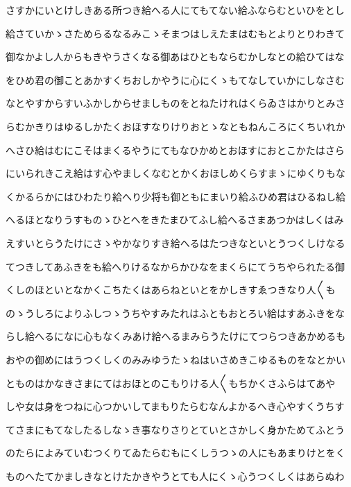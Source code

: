 \documentclass[a4paper,11pt,landscape]{ltjtarticle}
\begin{document}
\par\medskip
さすかにいとけしきある所つき給へる人にてもてない給ふならむといひをとし
\par\medskip
給さていかゝさためらるなるみこゝそまつはしえたまはむもとよりとりわきて
\par\medskip
御なかよし人からもきやうさくなる御あはひともならむかしなとの給ひてはな
\par\medskip
をひめ君の御ことあかすくちおしかやうに心にくゝもてなしていかにしなさむ
\par\medskip
なとやすからすいふかしからせましものをとねたけれはくらゐさはかりとみさ
\par\medskip
らむかきりはゆるしかたくおほすなりけりおとゝなともねんころにくちいれか
\par\medskip
へさひ給はむにこそはまくるやうにてもなひかめとおほすにおとこかたはさら
\par\medskip
にいられきこえ給はす心やましくなむとかくおほしめくらすまゝにゆくりもな
\par\medskip
くかるらかにはひわたり給へり少将も御ともにまいり給ふひめ君はひるねし給
\par\medskip
へるほとなりうすものゝひとへをきたまひてふし給へるさまあつかはしくはみ
\par\medskip
えすいとらうたけにさゝやかなりすき給へるはたつきなといとうつくしけなる
\par\medskip
てつきしてあふきをも給へりけるなからかひなをまくらにてうちやられたる御
\par\medskip
くしのほといとなかくこちたくはあらねといとをかしきすゑつきなり人〱も
\par\medskip
のゝうしろによりふしつゝうちやすみたれはふともおとろい給はすあふきをな
\par\medskip
らし給へるになに心もなくみあけ給へるまみらうたけにてつらつきあかめるも
\par\medskip
おやの御めにはうつくしくのみみゆうたゝねはいさめきこゆるものをなとかい
\par\medskip
とものはかなきさまにてはおほとのこもりける人〱もちかくさふらはてあや
\par\medskip
しや女は身をつねに心つかいしてまもりたらむなんよかるへき心やすくうちす
\par\medskip
てさまにもてなしたるしなゝき事なりさりとていとさかしく身かためてふとう
\par\medskip
のたらによみていむつくりてゐたらむもにくしうつゝの人にもあまりけとをく
\par\medskip
ものへたてかましきなとけたかきやうとても人にくゝ心うつくしくはあらぬわ
\end{document}
